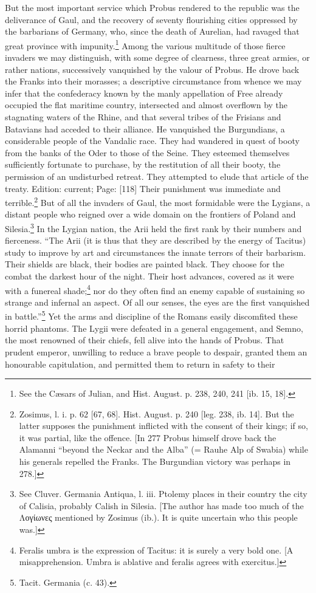 But the most important service which Probus rendered to the republic was the deliverance of Gaul, and the recovery of seventy flourishing cities oppressed by the barbarians of Germany, who, since the death of Aurelian, had ravaged that great province with impunity.\footnote{See the Cæsars of Julian, and Hist. August. p. 238, 240, 241 [ib. 15, 18].} Among the various multitude of those fierce invaders we may distinguish, with some degree of clearness, three great armies, or rather nations, successively vanquished by the valour of Probus. He drove back the Franks into their morasses; a descriptive circumstance from whence we may infer that the confederacy known by the manly appellation of Free already occupied the flat maritime country, intersected and almost overflown by the stagnating waters of the Rhine, and that several tribes of the Frisians and Batavians had acceded to their alliance. He vanquished the Burgundians, a considerable people of the Vandalic race. They had wandered in quest of booty from the banks of the Oder to those of the Seine. They esteemed themselves sufficiently fortunate to purchase, by the restitution of all their booty, the permission of an undisturbed retreat. They attempted to elude that article of the treaty. Edition: current; Page: [118] Their punishment was immediate and terrible.\footnote{Zosimus, l. i. p. 62 [67, 68]. Hist. August. p. 240 [leg. 238, ib. 14]. But the latter supposes the punishment inflicted with the consent of their kings; if so, it was partial, like the offence. [In 277 Probus himself drove back the Alamanni \texthebrew{“}beyond the Neckar and the Alba\texthebrew{}” (= Rauhe Alp of Swabia) while his generals repelled the Franks. The Burgundian victory was perhaps in 278.]} But of all the invaders of Gaul, the most formidable were the Lygians, a distant people who reigned over a wide domain on the frontiers of Poland and Silesia.\footnote{See Cluver. Germania Antiqua, l. iii. Ptolemy places in their country the city of Calisia, probably Calish in Silesia. [The author has made too much of the \textgreek{Λογίωνες} mentioned by Zosimus (ib.). It is quite uncertain who this people was.]} In the Lygian nation, the Arii held the first rank by their numbers and fierceness. \texthebrew{“}The Arii (it is thus that they are described by the energy of Tacitus) study to improve by art and circumstances the innate terrors of their barbarism. Their shields are black, their bodies are painted black. They choose for the combat the darkest hour of the night. Their host advances, covered as it were with a funereal shade;\footnote{Feralis umbra is the expression of Tacitus: it is surely a very bold one. [A misapprehension. Umbra is ablative and feralis agrees with exercitus.]} nor do they often find an enemy capable of sustaining so strange and infernal an aspect. Of all our senses, the eyes are the first vanquished in battle.\texthebrew{}”\footnote{Tacit. Germania (c. 43).} Yet the arms and discipline of the Romans easily discomfited these horrid phantoms. The Lygii were defeated in a general engagement, and Semno, the most renowned of their chiefs, fell alive into the hands of Probus. That prudent emperor, unwilling to reduce a brave people to despair, granted them an honourable capitulation, and permitted them to return in safety to their 